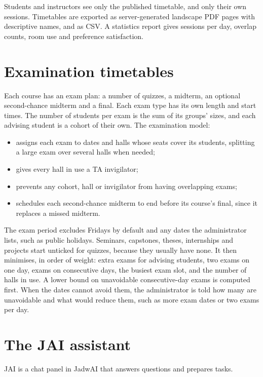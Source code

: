 Students and instructors see only the published timetable, and only their own sessions. Timetables are exported as server-generated landscape PDF pages with descriptive names, and as CSV. A statistics report gives sessions per day, overlap counts, room use and preference satisfaction.

\section{Examination timetables}

Each course has an exam plan: a number of quizzes, a midterm, an optional second-chance midterm and a final. Each exam type has its own length and start times. The number of students per exam is the sum of its groups' sizes, and each advising student is a cohort of their own. The examination model:
\begin{itemize}
\item assigns each exam to dates and halls whose seats cover its students, splitting a large exam over several halls when needed;
\item gives every hall in use a TA invigilator;
\item prevents any cohort, hall or invigilator from having overlapping exams;
\item schedules each second-chance midterm to end before its course's final, since it replaces a missed midterm.
\end{itemize}
The exam period excludes Fridays by default and any dates the administrator lists, such as public holidays. Seminars, capstones, theses, internships and projects start unticked for quizzes, because they usually have none.
It then minimises, in order of weight: extra exams for advising students, two exams on one day, exams on consecutive days, the busiest exam slot, and the number of halls in use. A lower bound on unavoidable consecutive-day exams is computed first. When the dates cannot avoid them, the administrator is told how many are unavoidable and what would reduce them, such as more exam dates or two exams per day.

\section{The JAI assistant}\label{evidence-jai}

JAI is a chat panel in JadwAI that answers questions and prepares tasks.


